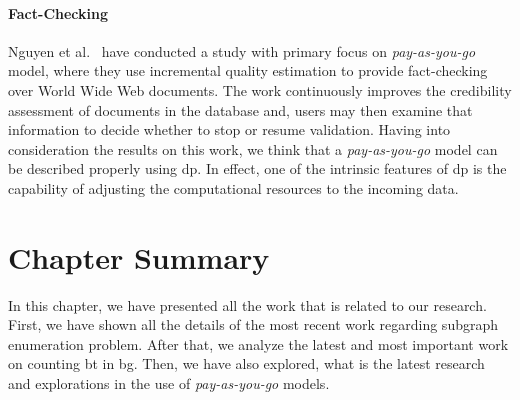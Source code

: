 \paragraph{Fact-Checking} Nguyen et al.~\cite{factcatch} have conducted a study with primary focus on \emph{pay-as-you-go} model, where they use incremental quality estimation to provide fact-checking over World Wide Web documents.
The work continuously improves the credibility assessment of documents in the database and, users may then examine that information to decide whether to stop or resume validation.
Having into consideration the results on this work, we think  that a \emph{pay-as-you-go} model can be described properly using \acrlong{dp}. In effect, one of the intrinsic features of \acrshort{dp} is the capability of adjusting the computational resources to the incoming data. 

\section{Chapter Summary}
In this chapter, we have presented all the work that is related to our research.
First, we have shown all the details of the most recent work regarding subgraph enumeration problem. 
After that, we analyze the latest and most important work on counting \acrlong{bt} in \acrlong{bg}.
Then, we have also explored, what is the latest research and explorations in the use of \emph{pay-as-you-go} models.
